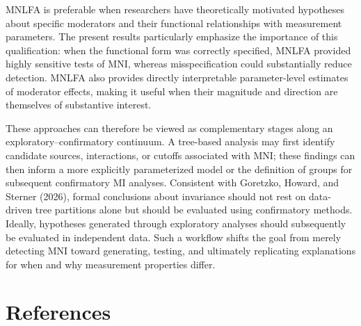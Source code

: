 \documentclass[
  man,
  floatsintext]{apa7}
\begin{document}
MNLFA is preferable when researchers have theoretically motivated
hypotheses about specific moderators and their functional relationships
with measurement parameters. The present results particularly emphasize
the importance of this qualification: when the functional form was
correctly specified, MNLFA provided highly sensitive tests of MNI,
whereas misspecification could substantially reduce detection. MNLFA
also provides directly interpretable parameter-level estimates of
moderator effects, making it useful when their magnitude and direction
are themselves of substantive interest.

These approaches can therefore be viewed as complementary stages along
an exploratory--confirmatory continuum. A tree-based analysis may first
identify candidate sources, interactions, or cutoffs associated with
MNI; these findings can then inform a more explicitly parameterized
model or the definition of groups for subsequent confirmatory MI
analyses. Consistent with Goretzko, Howard, and Sterner (2026), formal
conclusions about invariance should not rest on data-driven tree
partitions alone but should be evaluated using confirmatory methods.
Ideally, hypotheses generated through exploratory analyses should
subsequently be evaluated in independent data. Such a workflow shifts
the goal from merely detecting MNI toward generating, testing, and
ultimately replicating explanations for when and why measurement
properties differ.

\section*{References}\label{references}
\end{document}
